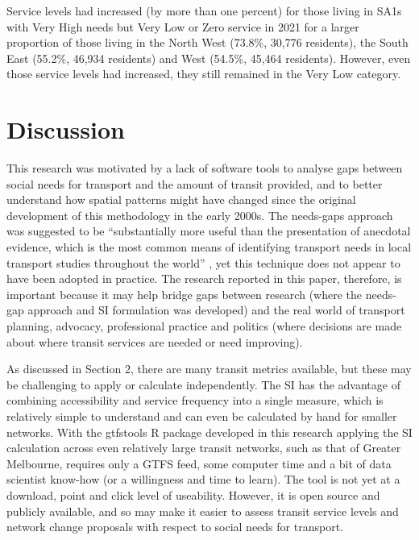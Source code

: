 \documentclass[preprint, 3p,
authoryear]{elsarticle} %
\begin{document}
Service levels had increased (by more than one percent) for those living
in SA1s with Very High needs but Very Low or Zero service in 2021 for a
larger proportion of those living in the North West (73.8\%, 30,776
residents), the South East (55.2\%, 46,934 residents) and West (54.5\%,
45,464 residents). However, even those service levels had increased,
they still remained in the Very Low category.

\section{Discussion}\label{discussion}

This research was motivated by a lack of software tools to analyse gaps
between social needs for transport and the amount of transit provided,
and to better understand how spatial patterns might have changed since
the original development of this methodology in the early 2000s. The
needs-gaps approach was suggested to be ``substantially more useful than
the presentation of anecdotal evidence, which is the most common means
of identifying transport needs in local transport studies throughout the
world'' \citep{currie2010identifying}, yet this technique does not
appear to have been adopted in practice. The research reported in this
paper, therefore, is important because it may help bridge gaps between
research (where the needs-gap approach and SI formulation was developed)
and the real world of transport planning, advocacy, professional
practice and politics (where decisions are made about where transit
services are needed or need improving).

As discussed in Section 2, there are many transit metrics available, but
these may be challenging to apply or calculate independently. The SI has
the advantage of combining accessibility and service frequency into a
single measure, which is relatively simple to understand and can even be
calculated by hand for smaller networks. With the gtfstools R package
developed in this research applying the SI calculation across even
relatively large transit networks, such as that of Greater Melbourne,
requires only a GTFS feed, some computer time and a bit of data
scientist know-how (or a willingness and time to learn). The tool is not
yet at a download, point and click level of useability. However, it is
open source and publicly available, and so may make it easier to assess
transit service levels and network change proposals with respect to
social needs for transport.
\end{document}
